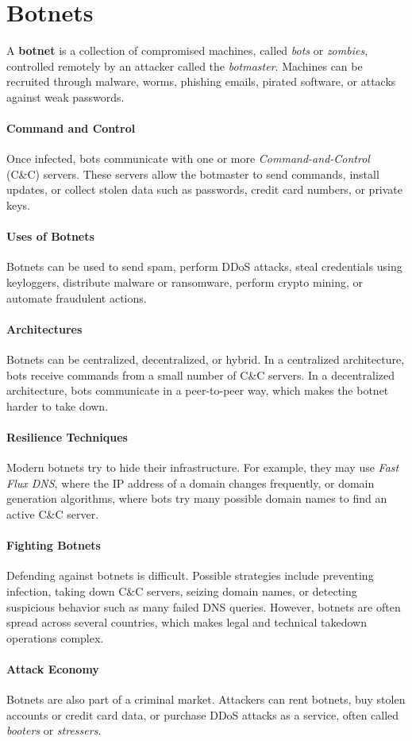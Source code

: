 \section{Botnets}

A \textbf{botnet} is a collection of compromised machines, called
\emph{bots} or \emph{zombies}, controlled remotely by an attacker called
the \emph{botmaster}. Machines can be recruited through malware, worms,
phishing emails, pirated software, or attacks against weak passwords.

\paragraph{Command and Control}
Once infected, bots communicate with one or more
\emph{Command-and-Control} (C\&C) servers. These servers allow the
botmaster to send commands, install updates, or collect stolen data such
as passwords, credit card numbers, or private keys.

\paragraph{Uses of Botnets}
Botnets can be used to send spam, perform DDoS attacks, steal
credentials using keyloggers, distribute malware or ransomware, perform
crypto mining, or automate fraudulent actions.

\paragraph{Architectures}
Botnets can be centralized, decentralized, or hybrid. In a centralized
architecture, bots receive commands from a small number of C\&C servers.
In a decentralized architecture, bots communicate in a peer-to-peer way,
which makes the botnet harder to take down.

\paragraph{Resilience Techniques}
Modern botnets try to hide their infrastructure. For example, they may
use \emph{Fast Flux DNS}, where the IP address of a domain changes
frequently, or domain generation algorithms, where bots try many possible
domain names to find an active C\&C server.

\paragraph{Fighting Botnets}
Defending against botnets is difficult. Possible strategies include
preventing infection, taking down C\&C servers, seizing domain names, or
detecting suspicious behavior such as many failed DNS queries. However,
botnets are often spread across several countries, which makes legal and
technical takedown operations complex.

\paragraph{Attack Economy}
Botnets are also part of a criminal market. Attackers can rent botnets,
buy stolen accounts or credit card data, or purchase DDoS attacks as a
service, often called \emph{booters} or \emph{stressers}.